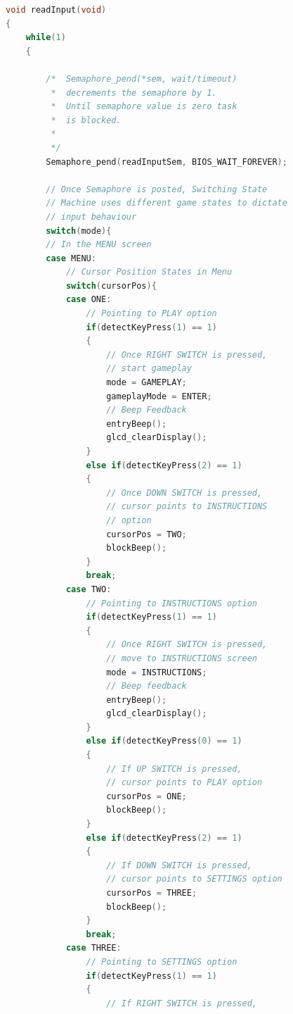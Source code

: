 \documentclass{article}
\begin{document}
  \begin{lstlisting}[basicstyle = \small, language = C]
void readInput(void)
{
    while(1)
    {

        /*  Semaphore_pend(*sem, wait/timeout) 
         *  decrements the semaphore by 1.
         *  Until semaphore value is zero task 
         *  is blocked.
         *
         */
        Semaphore_pend(readInputSem, BIOS_WAIT_FOREVER);

        // Once Semaphore is posted, Switching State 
        // Machine uses different game states to dictate 
        // input behaviour
        switch(mode){
        // In the MENU screen
        case MENU:
            // Cursor Position States in Menu
            switch(cursorPos){
            case ONE:
                // Pointing to PLAY option
                if(detectKeyPress(1) == 1)
                {
                    // Once RIGHT SWITCH is pressed, 
                    // start gameplay
                    mode = GAMEPLAY;
                    gameplayMode = ENTER;
                    // Beep Feedback
                    entryBeep();
                    glcd_clearDisplay();
                }
                else if(detectKeyPress(2) == 1)
                {
                    // Once DOWN SWITCH is pressed, 
                    // cursor points to INSTRUCTIONS 
                    // option
                    cursorPos = TWO;
                    blockBeep();
                }
                break;
            case TWO:
                // Pointing to INSTRUCTIONS option
                if(detectKeyPress(1) == 1)
                {
                    // Once RIGHT SWITCH is pressed, 
                    // move to INSTRUCTIONS screen
                    mode = INSTRUCTIONS;
                    // Beep feedback
                    entryBeep();
                    glcd_clearDisplay();
                }
                else if(detectKeyPress(0) == 1)
                {
                    // If UP SWITCH is pressed, 
                    // cursor points to PLAY option
                    cursorPos = ONE;
                    blockBeep();
                }
                else if(detectKeyPress(2) == 1)
                {
                    // If DOWN SWITCH is pressed, 
                    // cursor points to SETTINGS option
                    cursorPos = THREE;
                    blockBeep();
                }
                break;
            case THREE:
                // Pointing to SETTINGS option
                if(detectKeyPress(1) == 1)
                {
                    // If RIGHT SWITCH is pressed, 

\end{lstlisting}
\end{document}
